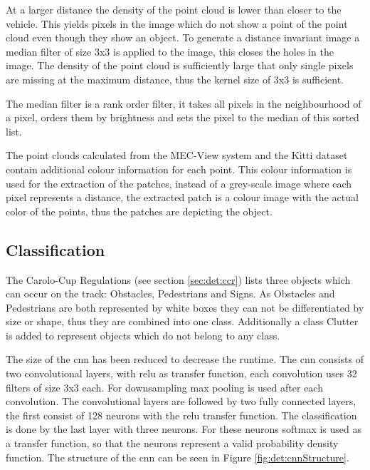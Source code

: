 At a larger distance the density of the point cloud is lower than closer to the vehicle. 
This yields pixels in the image which do not show a point of the point cloud even though they show an object. 
To generate a distance invariant image a median filter of size 3x3 is applied to the image, this closes the holes in the image.
The density of the point cloud is sufficiently large that only single pixels are missing at the maximum distance, thus the kernel size of 3x3 is sufficient.

The median filter is a rank order filter, it takes all pixels in the neighbourhood of a pixel, orders them by brightness and sets the pixel to the median of this sorted list.

The point clouds calculated from the MEC-View system and the Kitti dataset contain additional colour information for each point. 
This colour information is used for the extraction of the patches, instead of a grey-scale image where each pixel represents a distance, the extracted patch is a colour image with the actual color of the points, thus the patches are depicting the object.

\subsection{Classification}
The Carolo-Cup Regulations (see section \ref{sec:det:ccr}) lists three objects which can occur on the track: Obstacles, Pedestrians and Signs. As Obstacles and Pedestrians are both represented by white boxes they can not be differentiated by size or shape, thus they are combined into one class. Additionally a class Clutter is added to represent objects which do not belong to any class. 

The size of the \ac{cnn} has been reduced to decrease the runtime.
The \ac{cnn} consists of two convolutional layers, with \ac{relu} as transfer function, each convolution uses 32 filters of size 3x3 each. For downsampling max pooling is used after each convolution. 
The convolutional layers are followed by two fully connected layers, the first consist of 128 neurons with the \ac{relu} transfer function. The classification is done by the last layer with three neurons. For these neurons softmax is used as a transfer function, so that the neurons represent a valid probability density function.
The structure of the \ac{cnn} can be seen in Figure \ref{fig:det:cnnStructure}.

